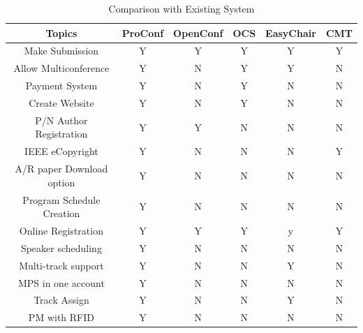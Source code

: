 \begin{center}
\begin{table}[htbp]
   \begin{tabular}{|c|c|c|c|c|c|}
     \hline
     Topics & ProConf & OpenConf & OCS & EasyChair & CMT \\\hline
     Make Submission & Y & Y & Y & Y & Y \\\hline
     Allow Multiconference & Y & N & Y & Y & N\\\hline
     Payment System & Y &N & Y & N & N  \\\hline
     Create Website  & Y & N & Y & N & N \\\hline
     P/N Author Registration & Y & Y & N & N & N \\\hline
     IEEE eCopyright & Y & N & N & N & Y \\\hline
     A/R paper Download option & Y & N & N & N & N\\\hline
     Program  Schedule Creation & Y &N & N & N & N \\\hline
     Online Registration & Y & Y & Y & y & Y\\\hline
     Speaker scheduling & Y & N & N & N & N\\\hline
     Multi-track support & Y & N & N & Y & N\\\hline
     MPS in one account & Y & N & N & N& N\\\hline
     Track Assign       &Y &N &N &Y &N \\\hline
     PM with RFID & Y & N & N & N & N\\\hline



   \end{tabular}
   \caption[Comparison with Existing System.]{Comparison with Existing System}
	\label{tab:comparison}

  \end{table}
  \end{center}


